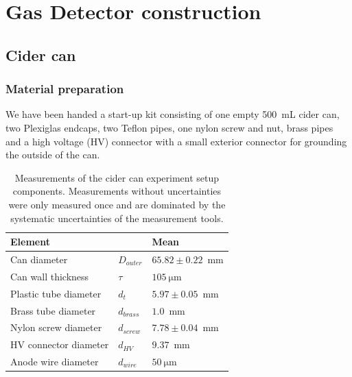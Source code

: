 \section{Gas Detector construction}
\label{sec:construction}

\subsection{Cider can}
\subsubsection{Material preparation}
We have been handed a start-up kit consisting of one empty \SI{500}{\milli\liter}
cider can, two Plexiglas endcaps, two Teflon pipes, one nylon screw and nut,
brass pipes and a high voltage (HV) connector with a small exterior connector for
grounding the outside of the can.

\begin{table}[htb]%
\begin{maybeleft}%
  \begin{tabularx}{\linewidth}{p{3.6cm}p{0.7cm}p{3cm}}
    \textbf{Element}       &               & \textbf{Mean} \\ \hline
    Can diameter           & $D_{outer}$   & $65.82 \pm 0.22$~mm     \\
    Can wall thickness     & $\tau$        & $\SI{105}{\micro\meter}$   \\
    Plastic tube diameter  & $d_{t}$       & $5.97 \pm 0.05$~mm       \\
    Brass tube diameter    & $d_{brass}$   & $1.0$~mm       \\
    Nylon screw diameter   & $d_{screw}$   & $7.78 \pm 0.04$~mm       \\
    HV connector diameter  & $d_{HV}$      & $9.37$~mm      \\
    Anode wire diameter    & $d_{wire}$    & $\SI{50}{\micro\meter}$    \\
    \hline
  \end{tabularx}
  \caption{Measurements of the cider can experiment setup components. Measurements without uncertainties were only measured once and are dominated by the systematic uncertainties of the measurement tools.}
  \label{Tab:cidercan_sizes}
\end{maybeleft}%
\end{table}

